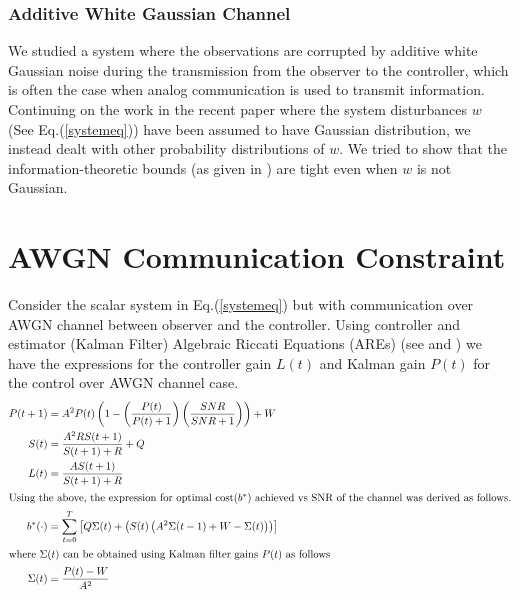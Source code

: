 \documentclass[12pt]{caltech_thesis_finalreport}
\begin{document}
	\subsection{Additive White Gaussian Channel}
We studied a system where the observations are corrupted by additive white Gaussian noise during the transmission from the observer to the controller, which is often the case when analog communication is used to transmit information.
Continuing on the work in the recent paper \cite{anatoly} where the system disturbances $w$ (See Eq.(\ref{systemeq})) have been assumed to have Gaussian distribution, we instead dealt with other probability distributions of $w$. We tried to show that the information-theoretic bounds (as given in \cite{victoria}) are tight even when $w$ is not Gaussian.

\chapter{AWGN Communication Constraint}
Consider the scalar system in Eq.(\ref{systemeq}) but with communication over AWGN channel between observer and the controller. Using controller and estimator (Kalman Filter) Algebraic Riccati Equations (AREs) (see \cite{anatoly} and \cite{lqg}) we have the expressions for the controller gain $L(t)$ and Kalman gain $P(t)$ for the control over AWGN channel case.
\begin{align}
P(t+1) &= A^{2}P(t)\left(1 - \left(\frac{P(t)}{P(t) + 1}\right)\left(\frac{SNR}{SNR + 1}\right)\right) + W\\
S(t) &= \frac{A^{2}RS(t+1)}{S(t+1) + R} + Q\\
L(t) &= \frac{AS(t+1)}{S(t+1) + R}\\
\intertext{Using the above, the expression for optimal cost($b^{*}$) achieved vs SNR of the channel was derived as follows.}
	\label{computedJ}
	 b^{*}(\cdot) &= \sum\limits_{t = 0}^{T} \left[Q\Sigma(t) + \left(S(t)\left(A^{2}\Sigma(t-1) + W - \Sigma(t)\right)\right)\right]\\
	 \intertext{where $\Sigma(t)$ can be obtained using Kalman filter gains $P(t)$ as follows}
	 \Sigma(t) &= \frac{P(t)-W}{A^{2}}
	\end{align}
\end{document}
